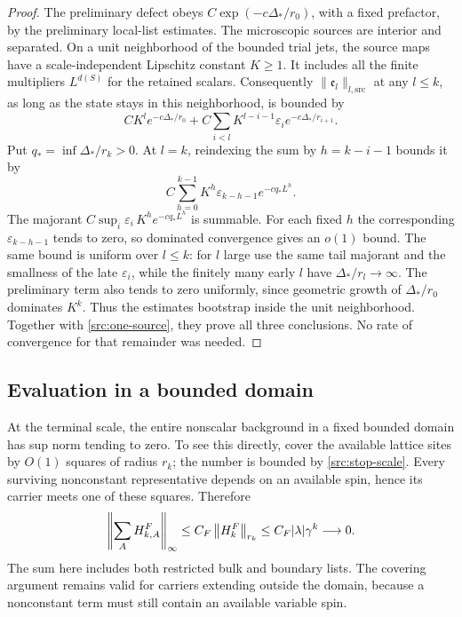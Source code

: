 \begin{proof}
The preliminary defect obeys
$C\exp(-c\Delta_*/r_0)$, with a fixed prefactor, by the preliminary
local-list estimates. The microscopic sources are interior and
separated. On a unit neighborhood of the bounded trial jets, the source
maps have a scale-independent Lipschitz constant $K\geq1$. It includes
all the finite multipliers $L^{d(S)}$ for the retained scalars.
Consequently $\|\mathfrak e_l\|_{l,\mathrm{src}}$ at any $l\leq k$,
as long as the state stays in this neighborhood, is bounded by
\begin{equation}
 C K^l e^{-c\Delta_*/r_0}
 +C\sum_{i<l}K^{l-i-1}\varepsilon_i
                       e^{-c\Delta_*/r_{i+1}}.
 \label{src:error-sum}
\end{equation}
Put $q_* =\inf \Delta_*/r_k>0$. At $l=k$, reindexing the sum by
$h=k-i-1$ bounds it by
\[
 C\sum_{h=0}^{k-1}K^h\varepsilon_{k-h-1}e^{-c q_*L^h}.
\]
The majorant $C\sup_i\varepsilon_i\,K^h e^{-c q_*L^h}$ is summable.
For each fixed $h$ the corresponding $\varepsilon_{k-h-1}$ tends to
zero, so dominated convergence gives an $o(1)$ bound. The same bound is
uniform over $l\leq k$: for $l$ large use the same tail majorant and the
smallness of the late $\varepsilon_i$, while the finitely many early
$l$ have $\Delta_*/r_l\to\infty$. The preliminary term also tends to
zero uniformly, since geometric growth of $\Delta_*/r_0$ dominates
$K^k$. Thus the estimates bootstrap inside the unit neighborhood.
Together with \eqref{src:one-source}, they prove all three conclusions.
No rate of convergence for that remainder was needed.
\end{proof}

\subsection{Evaluation in a bounded domain}

At the terminal scale, the entire nonscalar background in a fixed
bounded domain has sup norm tending to zero. To see this directly,
cover the available lattice sites by $O(1)$ squares of radius $r_k$;
the number is bounded by \eqref{src:stop-scale}. Every surviving
nonconstant representative depends on an available spin, hence its
carrier meets one of these squares. Therefore
\begin{equation}
 \left\|\sum_A H_{k,A}^F\right\|_\infty
 \leq C_F\left\|H_k^F\right\|_{r_k}
 \leq C_F|\lambda|\gamma^k\longrightarrow0.
 \label{src:total-background}
\end{equation}
The sum here includes both restricted bulk and boundary lists. The
covering argument remains valid for carriers extending outside the
domain, because a nonconstant term must still contain an available
variable spin.

